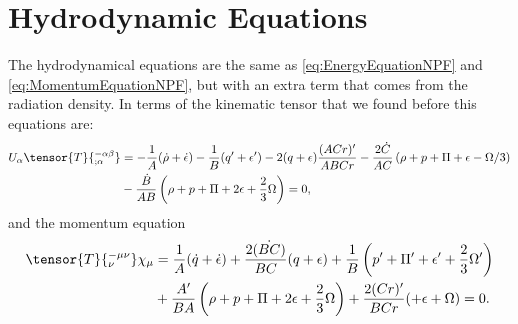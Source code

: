 \section{Hydrodynamic Equations}
The hydrodynamical equations are the same as \ref{eq:EnergyEquationNPF} and \ref{eq:MomentumEquationNPF}, but with an extra term that comes from the radiation density. In terms of the kinematic tensor that we found before this equations are:
\begin{align}
	\label{eq:EnergyConserNPFHERR}
	U_{\alpha} \tensor{T}{^{-\alpha\beta}_{;\alpha}} &= -\frac{1}{A}(\dot{\rho} + \dot{\epsilon}) - \frac{1}{B}(q' + \epsilon') - 2(q+\epsilon) \frac{(ACr)'}{ABCr} - \frac{2\dot{C}}{AC}\left(\rho + p + \Pi + \epsilon - \Omega/3\right) \\\nonumber
	&- \frac{\dot{B}}{AB} \left(\rho + p + \Pi + 2\epsilon + \frac{2}{3} \Omega \right) = 0,
\end{align}
and the momentum equation 
\begin{align}
\label{eq:MomentumConseNPFHERR}
	\tensor{T}{_{\nu}^{-\mu\nu}}\chi_{\mu} & = \frac{1}{A} (\dot{q} + \dot{\epsilon}) +  \frac{2\dot{(BC)}}{BC} (q+ \epsilon) + \frac{1}{B}\left(p' + \Pi' + \epsilon' + \frac{2}{3}\Omega'\right) \\\nonumber &+ \frac{A'}{BA} \left(\rho + p + \Pi + 2\epsilon + \frac{2}{3}\Omega\right) + \frac{2(Cr)'}{BCr} (+\epsilon + \Omega) = 0.
\end{align}

